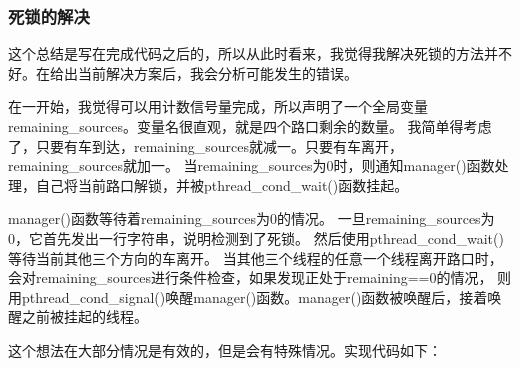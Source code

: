 \documentclass[a4paper,left=2.5cm,right=2.5cm,11pt]{article}
\begin{document}
\subsubsection{死锁的解决}
	这个总结是写在完成代码之后的，所以从此时看来，我觉得我解决死锁的方法并不好。在给出当前解决方案后，我会分析可能发生的错误。\par
	在一开始，我觉得可以用计数信号量完成，所以声明了一个全局变量remaining\_sources。变量名很直观，就是四个路口剩余的数量。
	我简单得考虑了，只要有车到达，remaining\_sources就减一。只要有车离开，remaining\_sources就加一。
	当remaining\_sources为0时，则通知manager()函数处理，自己将当前路口解锁，并被pthread\_cond\_wait()函数挂起。\par
	manager()函数等待着remaining\_sources为0的情况。
	一旦remaining\_sources为0，它首先发出一行字符串，说明检测到了死锁。
	然后使用pthread\_cond\_wait()等待当前其他三个方向的车离开。
	当其他三个线程的任意一个线程离开路口时，会对remaining\_sources进行条件检查，如果发现正处于remaining==0的情况，
	则用pthread\_cond\_signal()唤醒manager()函数。manager()函数被唤醒后，接着唤醒之前被挂起的线程。\par
	这个想法在大部分情况是有效的，但是会有特殊情况。实现代码如下：
\end{document}
